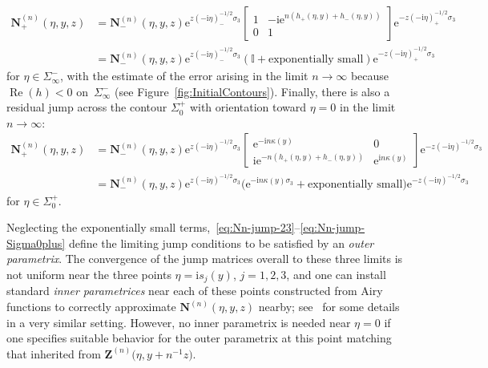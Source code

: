 \documentclass[11pt]{article}
\numberwithin{equation}{section}
\numberwithin{equation}{section}
\begin{document}
\begin{align*}
\mathbf{N}^{(n)}_+(\eta,y,z)&=\mathbf{N}^{(n)}_-(\eta,y,z)\mathrm{e}^{z(-\mathrm{i}\eta)^{-1/2}_-\sigma_3}\begin{bmatrix}1&-\mathrm{i}\mathrm{e}^{n(h_+(\eta,y)+h_-(\eta,y))}\\0 & 1\end{bmatrix}\mathrm{e}^{-z(-\mathrm{i}\eta)^{-1/2}_+\sigma_3}\\ &=
\mathbf{N}^{(n)}_-(\eta,y,z)\mathrm{e}^{z(-\mathrm{i}\eta)^{-1/2}_-\sigma_3}\left(\mathbb{I} + \text{exponentially small}\right)\mathrm{e}^{-z(-\mathrm{i}\eta)^{-1/2}_+\sigma_3}
\end{align*}
for $\eta\in\Sigma_\infty^-$, with the estimate of the error arising in the limit $n\to\infty$ because $\operatorname{Re}(h)<0$ on~$\Sigma_\infty^-$ (see Figure~\ref{fig:InitialContours}). Finally, there is also a residual jump across the contour $\Sigma_0^+$ with orientation toward $\eta=0$ in the limit $n\to\infty$:
\begin{align}
\mathbf{N}^{(n)}_+(\eta,y,z)&=\mathbf{N}^{(n)}_-(\eta,y,z)\mathrm{e}^{z(-\mathrm{i}\eta)^{-1/2}\sigma_3}\begin{bmatrix}
\mathrm{e}^{-\mathrm{i} n \kappa(y)} & 0 \\
\mathrm{i}\mathrm{e}^{-n(h_+(\eta,y)+h_-(\eta,y))} & \mathrm{e}^{\mathrm{i} n\kappa(y)}
\end{bmatrix}\mathrm{e}^{-z(-\mathrm{i}\eta)^{-1/2}\sigma_3}\label{eq:Nn-jump-Sigma0plus}
\\
&=\mathbf{N}^{(n)}_-(\eta,y,z)\mathrm{e}^{z(-\mathrm{i}\eta)^{-1/2}\sigma_3}\bigl(\mathrm{e}^{-\mathrm{i} n\kappa(y)\sigma_3} + \text{exponentially small}\bigr)\mathrm{e}^{-z(-\mathrm{i}\eta)^{-1/2}\sigma_3}\nonumber
\end{align}
for $\eta\in\Sigma_0^+$.

Neglecting the exponentially small terms,~\eqref{eq:Nn-jump-23}--\eqref{eq:Nn-jump-Sigma0plus} define the limiting jump conditions to be satisfied by an \emph{outer parametrix}. The convergence of the jump matrices overall to these three limits is not uniform near the three points $\eta=\mathrm{i} s_j(y)$, $j=1,2,3$, and one can
install standard \emph{inner parametrices} near each of these points constructed from Airy functions to correctly approximate $\mathbf{N}^{(n)}(\eta,y,z)$ nearby; see~\cite[Section 4.4.2]{BuckinghamM22} for some details in a very similar setting. However, no inner parametrix is needed near $\eta=0$ if one specifies suitable behavior for the outer parametrix at this point matching that inherited from $\mathbf{Z}^{(n)}\bigl(\eta,y+n^{-1}z\bigr)$.
\end{document}
